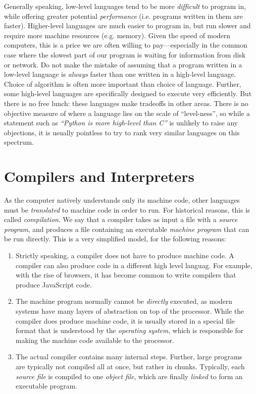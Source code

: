 Generally speaking, low-level languages tend to be more
\textit{difficult} to program in, while offering greater potential
\textit{performance} (i.e. programs written in them are faster).
Higher-level languages are much easier to program in, but run slower
and require more machine resources (e.g. memory).  Given the speed of
modern computers, this is a price we are often willing to
pay---especially in the common case where the slowest part of our
program is waiting for information from disk or network.  Do not make
the mistake of assuming that a program written in a low-level language
is \textit{always} faster than one written in a high-level language.
Choice of algorithm is often more important than choice of language.
Further, some high-level languages are specifically designed to
execute very efficiently.  But there is no free lunch: these languages
make tradeoffs in other areas.  There is no objective measure of where
a language lies on the scale of ``level-ness'', so while a statement
such as \textit{``Python is more high-level than C''} is unlikely to
raise any objections, it is usually pointless to try to rank very
similar languages on this spectrum.

\section{Compilers and Interpreters}

As the computer natively understands only its machine code, other
languages must be \textit{translated} to machine code in order to run.
For historical reasons, this is called \textit{compilation}.  We say
that a compiler takes as input a file with a \textit{source program},
and produces a file containing an executable \textit{machine program}
that can be run directly.  This is a very simplified model, for the
following reasons:

\begin{enumerate}
\item Strictly speaking, a compiler does not have to produce machine
  code.  A compiler can also produce code in a different high level
  languag.  For example, with the rise of browsers, it has become
  common to write compilers that produce JavaScript code.
\item The machine program normally cannot be \textit{directly}
  executed, as modern systems have many layers of abstraction on top
  of the processor.  While the compiler does produce machine code, it
  is usually stored in a special file format that is understood by the
  \textit{operating system}, which is responsible for making the
  machine code available to the processor.
\item The actual compiler contains many internal steps.  Further,
  large programs are typically not compiled all at once, but rather in
  chunks.  Typically, each \textit{source file} is compiled to one
  \textit{object file}, which are finally \textit{linked} to form an
  executable program.
\end{enumerate}

